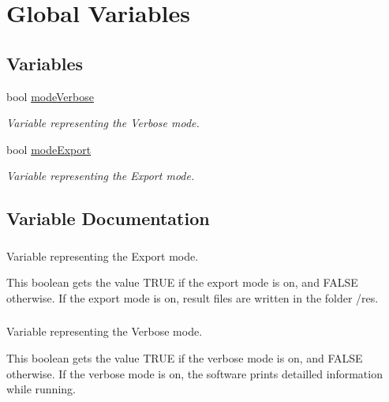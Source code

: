 \hypertarget{group__global}{\section{\-Global \-Variables}
\label{group__global}
}
\subsection*{\-Variables}
\begin{DoxyCompactItemize}
\item 
bool \hyperlink{group__global_gaad6a6dfdf4fe7218476d4e7b6b3c3c3f}{mode\-Verbose}
\begin{DoxyCompactList}\small\item\em \-Variable representing the \-Verbose mode. \end{DoxyCompactList}\item 
bool \hyperlink{group__global_gaa1e2a21621a42fc9b5bfe20792f549cf}{mode\-Export}
\begin{DoxyCompactList}\small\item\em \-Variable representing the \-Export mode. \end{DoxyCompactList}\end{DoxyCompactItemize}


\subsection{\-Variable \-Documentation}
\hypertarget{group__global_gaa1e2a21621a42fc9b5bfe20792f549cf}{
\subsubsection[{mode\-Export}]{}}\label{group__global_gaa1e2a21621a42fc9b5bfe20792f549cf}


\-Variable representing the \-Export mode. 

\-This boolean gets the value \-T\-R\-U\-E if the export mode is on, and \-F\-A\-L\-S\-E otherwise. \-If the export mode is on, result files are written in the folder /res. \hypertarget{group__global_gaad6a6dfdf4fe7218476d4e7b6b3c3c3f}{
\subsubsection[{mode\-Verbose}]{}}\label{group__global_gaad6a6dfdf4fe7218476d4e7b6b3c3c3f}


\-Variable representing the \-Verbose mode. 

\-This boolean gets the value \-T\-R\-U\-E if the verbose mode is on, and \-F\-A\-L\-S\-E otherwise. \-If the verbose mode is on, the software prints detailled information while running. 